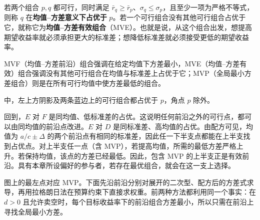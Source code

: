 \begin{tcolorbox}[knowledge]
若两个组合 $p,q$ 都可行，同时满足 $\bar r_q\ge\bar r_p$、$\sigma_q\le\sigma_p$，且至少一项为严格不等式，则称 $q$ 在\textbf{均值--方差意义下占优于} $p$。若一个可行组合没有其他可行组合占优于它，就称它为\textbf{均值--方差有效组合}（MVE）。也就是说，从这个组合出发，想提高期望收益率就必须承担更大的标准差；想降低标准差就必须接受更低的期望收益率。
\end{tcolorbox}

MVF（均值--方差前沿）组合强调在给定均值下方差最小，MVE（均值--方差有效）组合强调没有其他可行组合在均值与标准差上占优于它；MVP（全局最小方差组合）则是在所有可行均值中使方差最低的组合。

中，左上方阴影及两条蓝边上的可行组合都占优于 $p$，角点 $p$ 除外。

\begin{center}
\begin{minipage}{\linewidth}
\centering
\renewcommand{\thewjFigure}{\thechapter.S\arabic{wjFigure}}%
%
\par
{}
\end{minipage}
\end{center}

回到，$E$ 对 $F$ 是同均值、低标准差的占优。这说明任何前沿之外的可行点，都可以由同均值的前沿点改进。$E$ 对 $D$ 是同标准差、高均值的占优。由配方可见，均值为 $a/c\pm\Delta$ 的两个前沿点有相同的标准差，因此任一下半支点都能在上半支找到占优点。对上半支任一点（含 MVP），若提高均值，所需的最低方差严格上升。若保持均值，该点的方差已经最低。因此，包含 MVP 的上半支正是有效前沿。具有本章所设偏好的参与者，若存在最优组合，就会在这一支上选择。

图上的最左点对应 MVP。下面先沿前沿分别对展开的二次型、配方后的方差式求导，再用拉格朗日法在预算约束下直接求权重。前两种方法都利用同一个事实：在 $d>0$ 且允许卖空时，每个目标收益率下的前沿组合方差最小，所以只需在前沿上寻找全局最小方差。

